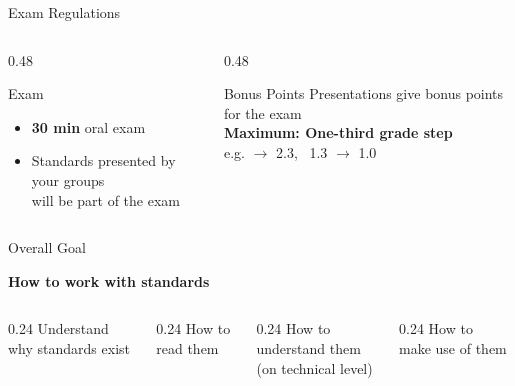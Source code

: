 \begin{frame}{Exam Regulations}

  \begin{columns}[T,onlytextwidth]
    \begin{column}{0.48\textwidth}
      \begin{block}{Exam}
        \begin{itemize}
          \item \textbf{30 min} oral exam
          \item Standards presented by your groups\\ will be part of the exam
        \end{itemize}
      \end{block}
    \end{column}

    \begin{column}{0.48\textwidth}
      \begin{alertblock}{Bonus Points}
        \centering
        Presentations give bonus points for the exam\\[0.2em]
        \textbf{Maximum: One-third grade step}\\
        \small e.g. $\rightarrow$ 2.3, \, 1.3 $\rightarrow$ 1.0
      \end{alertblock}
    \end{column}
  \end{columns}

  \vspace{0.5cm}

  \begin{block}{Overall Goal}
    \begin{center}
      \large
      \textbf{How to work with standards}
    \end{center}
    \vspace{-0.1cm}
    \begin{columns}[T,onlytextwidth]
      \begin{column}{0.24\textwidth}
        \centering
        Understand\\
        why standards exist
      \end{column}
      \begin{column}{0.24\textwidth}
        \centering
        How to\\
        read them
      \end{column}
      \begin{column}{0.24\textwidth}
        \centering
        How to\\
        understand them\\
        (on technical level)
      \end{column}
      \begin{column}{0.24\textwidth}
        \centering
        How to\\
        make use of them
      \end{column}
    \end{columns}
  \end{block}
\end{frame}


